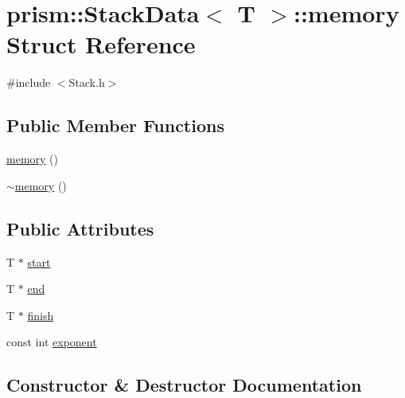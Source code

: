 \hypertarget{structprism_1_1_stack_data_1_1memory}{}\section{prism\+:\+:Stack\+Data$<$ T $>$\+:\+:memory Struct Reference}
\label{structprism_1_1_stack_data_1_1memory}


{\ttfamily \#include $<$Stack.\+h$>$}

\subsection*{Public Member Functions}
\begin{DoxyCompactItemize}
\item 
\hyperlink{structprism_1_1_stack_data_1_1memory_a8436051bcae1547f2b35b3dd00cb9bcd}{memory} ()
\item 
\hyperlink{structprism_1_1_stack_data_1_1memory_aa6972f951a723c1254625cd5981be21a}{$\sim$memory} ()
\end{DoxyCompactItemize}
\subsection*{Public Attributes}
\begin{DoxyCompactItemize}
\item 
T $\ast$ \hyperlink{structprism_1_1_stack_data_1_1memory_ac9148f9565f189adfe116b5690800a2c}{start}
\item 
T $\ast$ \hyperlink{structprism_1_1_stack_data_1_1memory_abcf7c0e39e800cb7c359939f7d48e143}{end}
\item 
T $\ast$ \hyperlink{structprism_1_1_stack_data_1_1memory_aeeae0886f3cfbe168999abba59314045}{finish}
\item 
const int \hyperlink{structprism_1_1_stack_data_1_1memory_a9a913ff54f45bd93a8ea88d009135533}{exponent}
\end{DoxyCompactItemize}


\subsection{Constructor \& Destructor Documentation}
